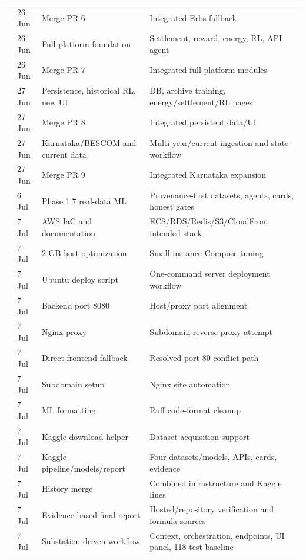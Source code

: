 \documentclass[10pt,a4paper]{article}
\begin{document}
\begin{footnotesize}
\begin{longtable}{@{}C{1.9cm}C{2.1cm}L{6.0cm}L{5.1cm}@{}}
 & 26 Jun & Merge PR 6 & Integrated Erbs fallback\\
 & 26 Jun & Full platform foundation & Settlement, reward, energy, RL, API agent\\
 & 26 Jun & Merge PR 7 & Integrated full-platform modules\\
 & 27 Jun & Persistence, historical RL, new UI & DB, archive training, energy/settlement/RL pages\\
 & 27 Jun & Merge PR 8 & Integrated persistent data/UI\\
 & 27 Jun & Karnataka/BESCOM and current data & Multi-year/current ingestion and state workflow\\
 & 27 Jun & Merge PR 9 & Integrated Karnataka expansion\\
 & 6 Jul & Phase 1.7 real-data ML & Provenance-first datasets, agents, cards, honest gates\\
 & 7 Jul & AWS IaC and documentation & ECS/RDS/Redis/S3/CloudFront intended stack\\
 & 7 Jul & 2 GB host optimization & Small-instance Compose tuning\\
 & 7 Jul & Ubuntu deploy script & One-command server deployment workflow\\
 & 7 Jul & Backend port 8080 & Host/proxy port alignment\\
 & 7 Jul & Nginx proxy & Subdomain reverse-proxy attempt\\
 & 7 Jul & Direct frontend fallback & Resolved port-80 conflict path\\
 & 7 Jul & Subdomain setup & Nginx site automation\\
 & 7 Jul & ML formatting & Ruff code-format cleanup\\
 & 7 Jul & Kaggle download helper & Dataset acquisition support\\
 & 7 Jul & Kaggle pipeline/models/report & Four datasets/models, APIs, cards, evidence\\
 & 7 Jul & History merge & Combined infrastructure and Kaggle lines\\
 & 7 Jul & Evidence-based final report & Hosted/repository verification and formula sources\\
 & 7 Jul & Substation-driven workflow & Context, orchestration, endpoints, UI panel, 118-test baseline\\
\end{longtable}
\end{footnotesize}
\end{document}
